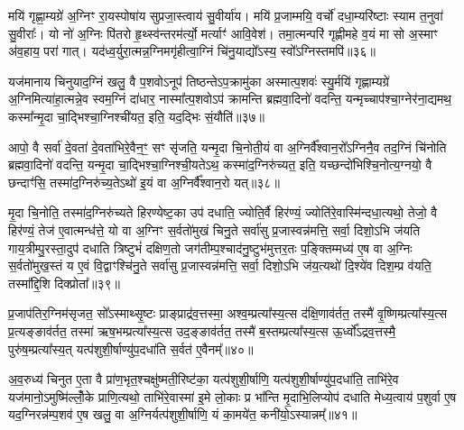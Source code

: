{\anuvakamend[{यान्य॒ग्नय॒ इत्या॒हेष्ट॑काना॒ꣳ॒ षोड॑श च॥८॥}]}

मयि॑ गृह्णा॒म्यग्रे॑ अ॒ग्निꣳ रा॒यस्पोषा॑य सुप्रजा॒स्त्वाय॑ सु॒वीर्या॑य। मयि॑ प्र॒जाम्मयि॒ वर्चो॑ दधा॒म्यरि॑ष्टाः स्याम त॒नुवा॑ सु॒वीराः᳚। यो नो॑ अ॒ग्निः पि॑तरो हृ॒थ्स्व॑न्तरम॑र्त्यो॒ मर्त्याꣳ॑ आवि॒वेश॑। तमा॒त्मन्परि॑ गृह्णीमहे व॒यं मा सो अ॒स्माꣳ अ॑व॒हाय॒ परा॑ गात्। यद॑ध्व॒र्युरा॒त्मन्न॒ग्निमगृ॑हीत्वा॒ग्निं चि॑नु॒याद्यो᳚\-ऽस्य॒ स्वो᳚\-ऽग्निस्तमपि॑॥३६॥

यज॑मानाय चिनुयाद॒ग्निं खलु॒ वै प॒शवो\-ऽनूप॑ तिष्ठन्ते\-ऽप॒क्रामु॑का अस्मात्प॒शवः॑ स्यु॒र्मयि॑ गृह्णाम्यग्रे॑ अ॒ग्निमित्या॑हा॒त्मन्ने॒व स्वम॒ग्निं दा॑धार॒ नास्मा᳚त्प॒शवो\-ऽप॑ क्रामन्ति ब्रह्मवा॒दिनो॑ वदन्ति॒ यन्मृच्चाप॑श्चा॒ग्नेर॑ना॒द्यमथ॒ कस्मा᳚न्मृ॒दा चा॒द्भिश्चा॒ग्निश्ची॑यत॒ इति॒ यद॒द्भिः सं॒यौति॑॥३७॥

आपो॒ वै सर्वा॑ दे॒वता॑ दे॒वता॑भिरे॒वैन॒ꣳ॒ सꣳ सृ॑जति॒ यन्मृ॒दा चि॒नोती॒यं वा अ॒ग्निर्वै᳚श्वान॒रो᳚\-ऽग्निनै॒व तद॒ग्निं चि॑नोति ब्रह्मवा॒दिनो॑ वदन्ति॒ यन्मृ॒दा चा॒द्भिश्चा॒ग्निश्ची॒यते\-ऽथ॒ कस्मा॑द॒ग्निरु॑च्यत॒ इति॒ यच्छन्दो॑भिश्चि॒नोत्य॒ग्नयो॒ वै छन्दाꣳ॑सि॒ तस्मा॑द॒ग्निरु॑च्य॒ते\-ऽथो॑ इ॒यं वा अ॒ग्निर्वै᳚श्वान॒रो यत्॥३८॥

मृ॒दा चि॒नोति॒ तस्मा॑द॒ग्निरु॑च्यते हिरण्येष्ट॒का उप॑ दधाति॒ ज्योति॒र्वै हिर॑ण्यं॒ ज्योति॑रे॒वास्मि॑न्दधा॒त्यथो॒ तेजो॒ वै हिर॑ण्यं॒ तेज॑ ए॒वात्मन्ध॑त्ते॒ यो वा अ॒ग्निꣳ स॒र्वतो॑मुखं चिनु॒ते सर्वा॑सु प्र॒जास्वन्न॑मत्ति॒ सर्वा॒ दिशो॒\-ऽभि ज॑यति गाय॒त्रीम्पु॒रस्ता॒दुप॑ दधाति त्रिष्टुभं॑ दक्षिण॒तो जग॑तीम्प॒श्चाद॑नु॒ष्टुभ॑मुत्तर॒तः प॒ङ्क्तिम्मध्य॑ ए॒ष वा अ॒ग्निः स॒र्वतो॑मुख॒स्तं य ए॒वं वि॒द्वाꣳश्चि॑नु॒ते सर्वा॑सु प्र॒जास्वन्न॑मत्ति॒ सर्वा॒ दिशो॒\-ऽभि ज॑य॒त्यथो॑ दि॒श्ये॑व दिश॒म्प्र व॑यति॒ तस्मा᳚द्दि॒शि दिक्प्रोता᳚॥३९॥

{\anuvakamend[{अपि॑ सं॒ यौति॑ वैश्वान॒रो यदे॒ष वै पञ्च॑विꣳशतिश्च॥९॥}]}

प्र॒जाप॑तिर॒ग्निम॑सृजत॒ सो᳚\-ऽस्माथ्सृ॒ष्टः प्राङ्प्राद्र॑व॒त्तस्मा॒ अश्व॒म्प्रत्या᳚स्य॒त्स द॑क्षि॒णाव॑र्तत॒ तस्मै॑ वृ॒ष्णिम्प्रत्या᳚स्य॒त्स प्र॒त्यङ्ङाव॑र्तत॒ तस्मा॑ ऋष॒भम्प्रत्या᳚स्य॒त्स उद॒ङ्ङाव॑र्तत॒ तस्मै॑ ब॒स्तम्प्रत्या᳚स्य॒त्स ऊ॒र्ध्वो᳚\-ऽद्रव॒त्तस्मै॒ पुरु॑ष॒म्प्रत्या᳚स्य॒त् यत्प॑शुशी॒र्\mbox{}षाण्यु॑प॒दधा॑ति स॒र्वत॑ ए॒वैनम्᳚॥४०॥

अ॒व॒रुध्य॑ चिनुत ए॒ता वै प्रा॑ण॒भृत॒श्चक्षु॑ष्मती॒रिष्ट॑का॒ यत्प॑शुशी॒र्\mbox{}षाणि॒ यत्प॑शुशी॒र्\mbox{}षाण्यु॑प॒दधा॑ति॒ ताभि॑रे॒व यज॑मानो॒\-ऽमुष्मि॑ल्लोँ॒के प्राणि॒त्यथो॒ ताभि॑रे॒वास्मा॑ इ॒मे लो॒काः प्र भा᳚न्ति मृ॒दाभि॒लिप्योप॑ दधाति मेध्य॒त्वाय॑ प॒शुर्वा ए॒ष यद॒ग्निरन्न॑म्प॒शव॑ ए॒ष खलु॒ वा अ॒ग्निर्यत्प॑शुशी॒र्\mbox{}षाणि॒ यं का॒मये॑त॒ कनी॑यो॒\-ऽस्यान्नम्᳚॥४१॥

